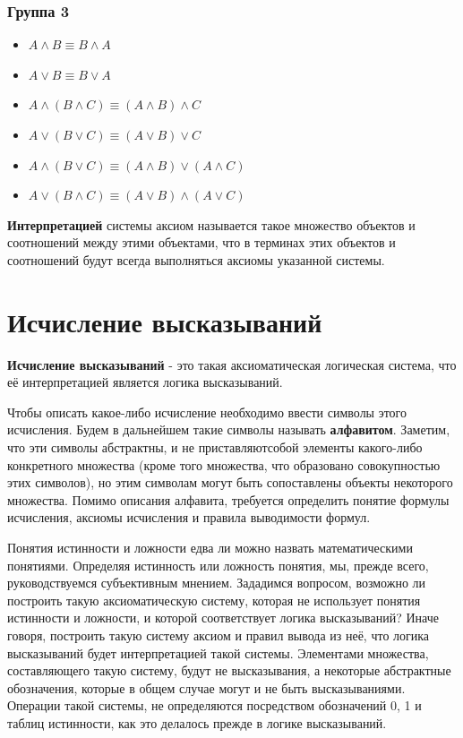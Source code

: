 \documentclass[12pt,letterpaper]{article}
\begin{document}
\subsubsection{Группа 3}

\begin{itemize}
  \item \(A \wedge B \equiv B \wedge A\)
  \item \(A \vee B \equiv B \vee A\)
  \item \(A \wedge (B \wedge C) \equiv (A \wedge B) \wedge C\)
  \item \(A \vee (B \vee C) \equiv (A \vee B) \vee C\)
  \item \(A \wedge (B \vee C) \equiv (A \wedge B) \vee (A \wedge C)\)
  \item \(A \vee (B \wedge C) \equiv (A \vee B) \wedge (A \vee C)\)
\end{itemize}

\textbf{Интерпретацией} системы аксиом называется такое множество объектов и соотношений между этими объектами, что в терминах этих объектов и соотношений будут всегда выполняться аксиомы указанной системы.

\section{Исчисление высказываний}

\textbf{Исчисление высказываний} - это такая аксиоматическая логическая система, что её интерпретацией является логика высказываний.

Чтобы описать какое-либо исчисление необходимо ввести символы этого исчисления. Будем в дальнейшем такие символы называть \textbf{алфавитом}. Заметим, что эти символы абстрактны, и не приставляютсобой элементы какого-либо конкретного множества (кроме того множества, что образовано совокупностью этих символов), но этим символам могут быть сопоставлены объекты некоторого множества. Помимо описания алфавита, требуется определить понятие формулы исчисления, аксиомы исчисления и правила выводимости формул.

Понятия истинности и ложности едва ли можно назвать математическими понятиями. Определяя истинность или ложность понятия, мы, прежде всего, руководствуемся субъективным мнением. Зададимся вопросом, возможно ли построить такую аксиоматическую систему, которая не использует понятия истинности и ложности, и которой соответствует логика высказываний? Иначе говоря, построить такую систему аксиом и правил вывода из неё, что логика высказываний будет интерпретацией такой системы. Элементами множества, составляющего такую систему, будут не высказывания, а некоторые абстрактные обозначения, которые в общем случае могут и не быть высказываниями. Операции такой системы, не определяются посредством обозначений 0, 1 и таблиц истинности, как это делалось прежде в логике высказываний.
\end{document}
